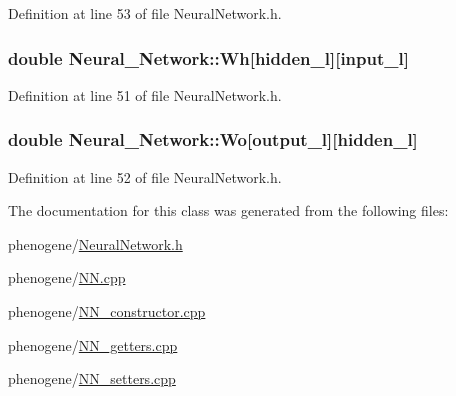 Definition at line 53 of file Neural\-Network.\-h.

\hypertarget{a00003_a45dfc138d645e05eaeaa6ca6bb3df818}{
\subsubsection[{Wh}]{\setlength{\rightskip}{0pt plus 5cm}double Neural\-\_\-\-Network\-::\-Wh\mbox{[}{\bf hidden\-\_\-l}\mbox{]}\mbox{[}{\bf input\-\_\-l}\mbox{]}\hspace{0.3cm}{\ttfamily [private]}}}\label{d1/d7c/a00003_a45dfc138d645e05eaeaa6ca6bb3df818}


Definition at line 51 of file Neural\-Network.\-h.

\hypertarget{a00003_ad6730ce7c9fc3937299dd32473b12d1d}{
\subsubsection[{Wo}]{\setlength{\rightskip}{0pt plus 5cm}double Neural\-\_\-\-Network\-::\-Wo\mbox{[}{\bf output\-\_\-l}\mbox{]}\mbox{[}{\bf hidden\-\_\-l}\mbox{]}\hspace{0.3cm}{\ttfamily [private]}}}\label{d1/d7c/a00003_ad6730ce7c9fc3937299dd32473b12d1d}


Definition at line 52 of file Neural\-Network.\-h.



The documentation for this class was generated from the following files\-:\begin{DoxyCompactItemize}
\item 
phenogene/\hyperlink{a00014}{Neural\-Network.\-h}\item 
phenogene/\hyperlink{a00015}{N\-N.\-cpp}\item 
phenogene/\hyperlink{a00016}{N\-N\-\_\-constructor.\-cpp}\item 
phenogene/\hyperlink{a00017}{N\-N\-\_\-getters.\-cpp}\item 
phenogene/\hyperlink{a00018}{N\-N\-\_\-setters.\-cpp}\end{DoxyCompactItemize}
